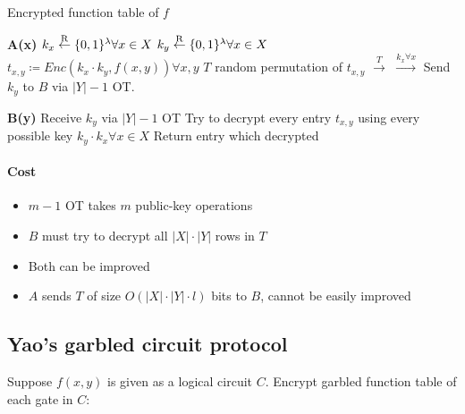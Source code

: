 \begin{algorithm}
		\caption{Encrypted function table of $f$}

		\begin{multicols}{2}
				\begin{algorithmic}[0]
						\State \textbf{A(x)}
						\State $k_x \overset{\mathrm{R}}{\gets} \{0, 1\}^\lambda \forall x \in X$
						\State $k_y \overset{\mathrm{R}}{\gets} \{0, 1\}^\lambda \forall x \in X$
						\State $t_{x, y} \coloneqq Enc(k_x \cdot k_y, f(x, y)) \forall x, y$
						\State $T$ random permutation of $t_{x, y}$
						\State $\xrightarrow{T}$
						\State $\xrightarrow{k_{x} \forall x}$
						\State Send $k_y$ to $B$ via $|Y|-1$ OT.
				\end{algorithmic}

				\columnbreak

				\begin{algorithmic}[0]
						\State \textbf{B(y)}
						\State
						\State
						\State
						\State
						\State
						\State
						\State
						\State Receive $k_y$ via $|Y|-1$ OT
						\State Try to decrypt every entry $t_{x, y}$ using every possible key $k_y \cdot k_x \forall x \in X$
						\State Return entry which decrypted
				\end{algorithmic}
		\end{multicols}
\end{algorithm}

\paragraph{Cost}

\begin{itemize}
		\item $m-1$ OT takes $m$ public-key operations
		\item $B$ must try to decrypt all $|X| \cdot |Y|$ rows in $T$
		\item Both can be improved
		\item $A$ sends $T$ of size $O(|X| \cdot |Y| \cdot l)$ bits to $B$,
				cannot be easily improved
\end{itemize}

\subsection{Yao's garbled circuit protocol}

Suppose $f(x, y)$ is given as a logical circuit $C$. Encrypt garbled function
table of each gate in $C$:

